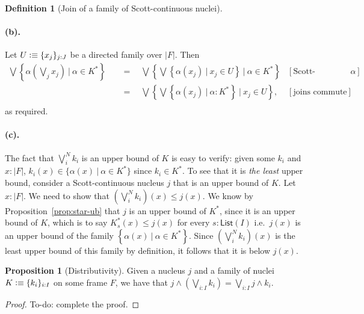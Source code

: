 \documentclass[a4paper, 11pt]{article}
\theoremstyle{definition}
\newtheorem{prop}{Proposition}
\newtheorem{defn}{Definition}
\newcommand{\setof}[1]{\left\{ #1 \right\}}
\newcommand{\is}{\vcentcolon\equiv}
\newcommand{\todo}[1]{{\large\color{orange}\textsf{To-do: #1.}}}
\begin{document}
\begin{defn}[Join of a family of Scott-continuous nuclei]
  \paragraph{(b).} Let $U \is \{ x_j \}_{j : J}$ be a directed family over $| F |$. Then
  \begin{align*}
       \bigvee \setof{ \alpha\left(\bigvee_j x_j\right) ~|~ \alpha \in K^* }
  &\quad=\quad \bigvee \setof{ \bigvee \setof{ \alpha(x_j) ~|~ x_j \in U } ~|~ \alpha \in K^* }  & [\text{Scott-continuity of $\alpha$}] \\
  &\quad=\quad \bigvee \setof{ \bigvee \setof{ \alpha(x_j) ~|~ \alpha : K^* } ~|~ x_j \in U }, & [\text{joins commute}]           \\
  \end{align*}
  as required.

  \paragraph{(c).} The fact that $\bigvee^N_i k_i$ is an upper bound of $K$ is easy to verify:
  given some $k_i$ and $x : | F |$, $k_i(x) \in \{ \alpha(x) ~|~ \alpha \in K^* \}$ since $k_i \in K^*$. To see that
  it is \emph{the least} upper bound, consider a Scott-continuous nucleus $j$ that is an upper bound
  of $K$. Let $x : | F |$. We need to show that $\left(\bigvee^N_i k_i\right)(x) \le j(x)$. We know by
  Proposition~\ref{prop:star-ub} that $j$ is an upper bound of $K^*$, since it is an upper bound of
  $K$, which is to say $K^*_{s}(x) \le j(x)$ for every $s : \mathsf{List}(I)$ i.e.\ $j(x)$ is an
  upper bound of the family $\setof{ \alpha(x) ~|~ \alpha \in K^* }$. Since $\left(\bigvee^N_i k_i\right)(x)$ is the
  least upper bound of this family by definition, it follows that it is below $j(x)$.
\end{defn}

\begin{prop}[Distributivity]
  Given a nucleus $j$ and a family of nuclei $K \is \{ k_i \}_{i : I}$ on some frame $F$, we have
  that $j \wedge \left(\bigvee_{i : I} k_i\right) = \bigvee_{i : I} j \wedge k_i$.
\end{prop}
\begin{proof}
  \todo{complete the proof}
\end{proof}

\printbibliography
\end{document}
